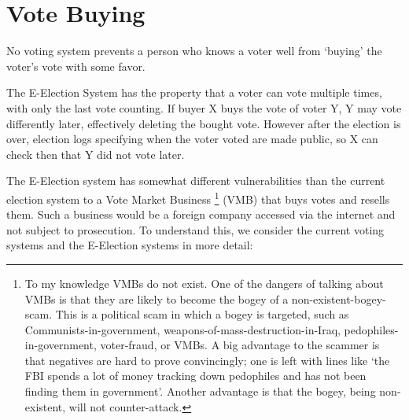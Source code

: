 \documentclass[12pt]{article}
\begin{document}
\section{Vote Buying}

No voting system prevents a person who knows a voter well from
`buying' the voter's vote with some favor.

The E-Election System has the property that a voter
can vote multiple times, with only the last vote counting.
If buyer X buys the vote of voter Y, Y may vote differently
later, effectively deleting the bought vote.  However after
the election is over, election logs specifying when the voter
voted are made public, so X can check then that Y did not
vote later.

The E-Election system has somewhat different vulnerabilities than the current
election system to a Vote Market Business%
\footnote{To my knowledge VMBs do not exist.
One of the dangers of talking about VMBs is that they
are likely to become the bogey of a non-existent-bogey-scam.  This is
a political scam in which a bogey is targeted, such as
Communists-in-government, weapons-of-mass-destruction-in-Iraq,
pedophiles-in-government, voter-fraud, or VMBs.
A big advantage to the scammer is that negatives are hard to prove
convincingly; one is left with lines like `the FBI spends a
lot of money tracking down pedophiles and has not been finding
them in government'.  Another advantage is that the bogey, being
non-existent, will not counter-attack.}%
(VMB) that buys
votes and resells them.  Such a business would be a foreign
company accessed via the internet and not subject to prosecution.
To understand this, we consider the current voting systems
and the E-Election systems in more detail:
\end{document}
